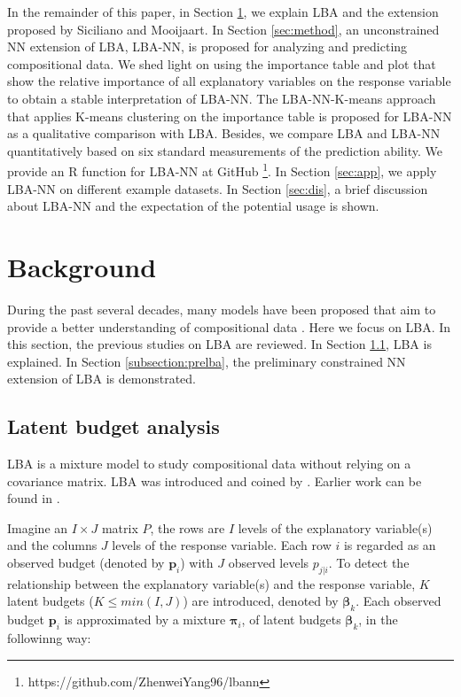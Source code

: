 \documentclass[]{interact}
\theoremstyle{plain}%
\theoremstyle{definition}
\theoremstyle{remark}
\begin{document}
In the remainder of this paper, in Section \ref{sec:bg}, we explain LBA
and the extension proposed by Siciliano and Mooijaart. In Section
\ref{sec:method}, an unconstrained NN extension of LBA, LBA-NN, is
proposed for analyzing and predicting compositional data. We shed light
on using the importance table and plot that show the relative importance
of all explanatory variables on the response variable to obtain a stable
interpretation of LBA-NN. The LBA-NN-K-means approach that applies
K-means clustering on the importance table is proposed for LBA-NN as a
qualitative comparison with LBA. Besides, we compare LBA and LBA-NN
quantitatively based on six standard measurements of the prediction
ability. We provide an R function for LBA-NN at GitHub
\footnote{\label{footnote:lbann} https://github.com/ZhenweiYang96/lbann}.
In Section \ref{sec:app}, we apply LBA-NN on different example datasets.
In Section \ref{sec:dis}, a brief discussion about LBA-NN and the
expectation of the potential usage is shown.

\hypertarget{sec:bg}{%
\section{Background}\label{sec:bg}}

During the past several decades, many models have been proposed that aim
to provide a better understanding of compositional data
\citep{desarbo1993, hsu2019}. Here we focus on LBA. In this section, the
previous studies on LBA are reviewed. In Section \ref{subsection:lba},
LBA is explained. In Section \ref{subsection:prelba}, the preliminary
constrained NN extension of LBA is demonstrated.

\hypertarget{subsection:lba}{%
\subsection{Latent budget analysis}\label{subsection:lba}}

LBA is a mixture model to study compositional data without relying on a
covariance matrix. LBA was introduced and coined by \cite{devan1988}.
Earlier work can be found in \cite{goodman1974}.

Imagine an \(I \times J\) matrix \(P\), the rows are \(I\) levels of the
explanatory variable(s) and the columns \(J\) levels of the response
variable. Each row \(i\) is regarded as an observed budget (denoted by
\(\bm{p}_i\)) with \(J\) observed levels \(p_{j|i}\). To detect the
relationship between the explanatory variable(s) and the response
variable, \(K\) latent budgets (\(K \leq min(I,J)\)) are introduced,
denoted by \(\boldsymbol\beta_k\). Each observed budget \(\bm{p}_i\) is
approximated by a mixture \(\boldsymbol\pi_i\), of latent budgets
\(\boldsymbol\beta_k\), in the followinng way:
\end{document}

